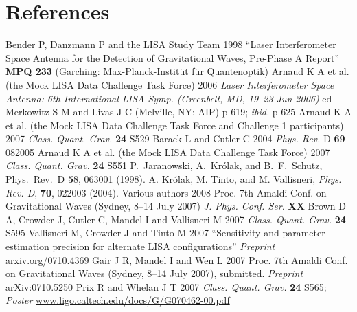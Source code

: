 \documentclass{iopart}
\begin{document}


\section*{References}

\begin{thebibliography}{99}
%
 Bender P, Danzmann P and
  the LISA Study Team 1998 ``Laser Interferometer Space Antenna for the Detection of Gravitational Waves, Pre-Phase A Report'' \textbf{MPQ 233} (Garching: Max-Planck-Instit\"ut f\"ur
  Quantenoptik) 
%
 Arnaud K A et al. (the Mock LISA Data Challenge Task Force) 2006 
\textit{Laser Interferometer Space Antenna: 6th International LISA Symp. (Greenbelt, MD, 19--23 Jun 2006)} ed Merkowitz S M and Livas J C (Melville, NY: AIP) p 619; \textit{ibid.} p 625
%
 Arnaud K A et al. (the Mock LISA Data Challenge Task Force and Challenge 1 participants) 2007 \textit{Class. Quant. Grav.} \textbf{24} S529
%
 Barack L and Cutler C 2004 \textit{Phys. Rev.} D \textbf{69} 082005
%
 Arnaud K A et al. (the Mock LISA Data Challenge Task Force) 2007 \textit{Class. Quant. Grav.} \textbf{24} S551
%
P.\ Jaranowski, A.\ Kr\'olak, and B.\ F.\ Schutz, Phys.\ Rev.\ D
{\textbf 58}, 063001 (1998).
%
 A. Kr\'olak, M. Tinto, and M. Vallisneri, {\it Phys. Rev. D}, {\bf 70},
022003 (2004).
%
 Various authors 2008 Proc. 7th Amaldi Conf. on Gravitational Waves (Sydney, 8--14 July 2007) \textit{J. Phys. Conf. Ser.} \textbf{XX}
%
 Brown D A, Crowder J, Cutler C, Mandel I and Vallisneri M 2007 \textit{Class. Quant. Grav.} \textbf{24} S595
%
 Vallisneri M, Crowder J and Tinto M 2007 ``Sensitivity and parameter-estimation precision for alternate LISA configurations'' \textit{Preprint} arxiv.org/0710.4369 
%
 Gair J R, Mandel I and Wen L 2007 Proc. 7th Amaldi Conf. on Gravitational Waves (Sydney, 8--14 July 2007), submitted. \textit{Preprint} arXiv:0710.5250
%
 Prix R and Whelan J T 2007 \textit{Class. Quant. Grav.} \textbf{24} S565; \textit{Poster} \url{www.ligo.caltech.edu/docs/G/G070462-00.pdf}
%
\end{thebibliography}
\end{document}
